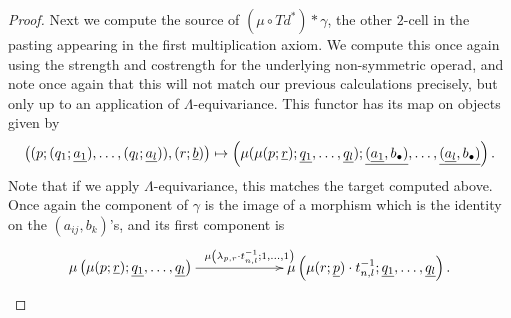 \begin{proof}
Next we compute the source of $(\mu \circ Td^{*})*\gamma$, the other $2$-cell in the pasting appearing in the first multiplication axiom. We compute this once again using the strength and costrength for the underlying non-symmetric operad, and note once again that this will not match our previous calculations precisely, but only up to an application of $\Lambda$-equivariance. This functor has its map on objects given by
  \[
    \left( (p; (q_{1}; \underline{a_{1}}), \ldots, (q_{l}; \underline{a_{l}})), (r; \underline{b}) \right) \mapsto \left(\mu(\mu(p; \underline{r}); \underline{q_{1}}, \ldots, \underline{q_{l}}); \underline{(\underline{a_{1}}, b_{\bullet})}, \ldots, \underline{(\underline{a_{l}}, b_{\bullet})} \right).
  \]
  Note that if we apply $\Lambda$-equivariance, this matches the target computed above. Once again the component of $\gamma$ is the image of a morphism which is the identity on the $(a_{ij}, b_{k})$'s, and its first component is
  \[
    \xy
      {\ar^{\mu\left(\lambda_{p,r} \cdot t^{-1}_{n,l}; 1, \ldots, 1\right)} (0,0)*+{\mu\left(\mu(p; \un{r}); \un{q_{1}}, \ldots, \un{q_{l}}\right)}; (60,0)*+{\mu\left(\mu(r; \un{p})\cdot t^{-1}_{n,l}; \un{q_{1}}, \ldots, \un{q_{l}}\right).} }
    \endxy
  \]


\end{proof}
